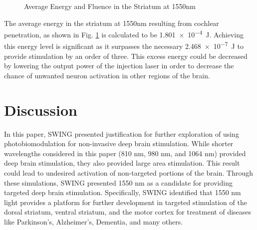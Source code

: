 \documentclass[journal,twoside,web]{ieeecolor}
\begin{document}
\begin{figure}[hbt]
    \caption{\label{fig:Avg1550} Average Energy and Fluence in the Striatum at 1550nm}
\end{figure}

The average energy in the striatum at 1550nm resulting from cochlear penetration, as shown in Fig. \ref{fig:Avg1550} is calculated to 
be \SI{1.801e-4}{\joule}. Achieving this energy level is significant as it surpasses the necessary \SI{2.468e-7}{\joule} to provide stimulation by an order of three. 
This excess energy could be decreased by lowering the output power of the injection laser in order to decrease the chance of unwanted neuron 
activation in other regions of the brain.

\section{Discussion}
\label{sec:next steps}
In this paper, SWING presented justification for further exploration of using photobiomodulation for non-invasive deep brain stimulation. While 
shorter wavelengths considered in this paper (810 nm, 980 nm, and 1064 nm) provided deep brain stimulation, they also provided large area stimulation. 
This result could lead to undesired activation of non-targeted portions of the brain. Through these simulations, SWING presented 1550 nm as a candidate for 
providing targeted deep brain stimulation. Specifically, SWING identified that 1550 nm light provides a platform for further development in targeted 
stimulation of the dorsal striatum, ventral striatum, and the motor cortex for treatment of diseases like Parkinson's, Alzheimer's, Dementia, and many others.
\end{document}
